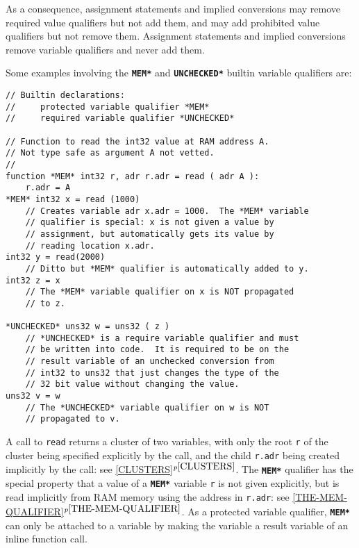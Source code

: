 \documentclass[12pt]{article}
\newcommand{\TT}[1]{{\tt \bfseries #1}}
\newcommand{\itemref}[1]{\ref{#1}$^{p\pageref{#1}}$}
\newenvironment{indpar}[1][0.3in]%
	{\begin{list}{}%
		     {\setlength{\itemsep}{0in}%
		      \setlength{\topsep}{0in}%
		      \setlength{\parsep}{1ex}%
		      \setlength{\labelwidth}{#1}%
		      \setlength{\leftmargin}{#1}%
		      \addtolength{\leftmargin}{\labelsep}}%
	 \item}%
	{\end{list}}
\begin{document}
As a consequence, assignment statements and implied conversions
may remove required value qualifiers but not add them, and
may add prohibited value qualifiers
but not remove them.  Assignment statements and implied conversions
remove variable qualifiers and never add them.

Some examples involving the \TT{*MEM*} and \TT{*UNCHECKED*}
builtin variable qualifiers are:
\begin{indpar}\begin{verbatim}
// Builtin declarations:
//     protected variable qualifier *MEM*
//     required variable qualifier *UNCHECKED*

// Function to read the int32 value at RAM address A.
// Not type safe as argument A not vetted.
//
function *MEM* int32 r, adr r.adr = read ( adr A ):
    r.adr = A
*MEM* int32 x = read (1000)
    // Creates variable adr x.adr = 1000.  The *MEM* variable
    // qualifier is special: x is not given a value by
    // assignment, but automatically gets its value by
    // reading location x.adr.
int32 y = read(2000)
    // Ditto but *MEM* qualifier is automatically added to y.
int32 z = x
    // The *MEM* variable qualifier on x is NOT propagated
    // to z.

*UNCHECKED* uns32 w = uns32 ( z )
    // *UNCHECKED* is a require variable qualifier and must
    // be written into code.  It is required to be on the
    // result variable of an unchecked conversion from
    // int32 to uns32 that just changes the type of the
    // 32 bit value without changing the value.
uns32 v = w
    // The *UNCHECKED* variable qualifier on w is NOT
    // propagated to v.
\end{verbatim}\end{indpar}

A call to {\tt read} returns a cluster of
two variables, with only the root {\tt r} of the cluster being
specified explicitly by the call, and the child {\tt r.adr} being
created implicitly by the call: see \itemref{CLUSTERS}.
The \TT{*MEM*} qualifier has the special property that a value of a \TT{*MEM*}
variable {\tt r} is not given explicitly, but is read implicitly from
RAM memory using the address in {\tt r.adr}: see \itemref{THE-MEM-QUALIFIER}.
As a protected variable qualifier, \TT{*MEM*} can only be attached to
a variable by making the variable a result variable of an inline
function call.
\end{document}
